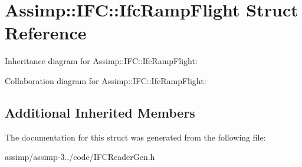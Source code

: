 \hypertarget{struct_assimp_1_1_i_f_c_1_1_ifc_ramp_flight}{\section{Assimp\+:\+:I\+F\+C\+:\+:Ifc\+Ramp\+Flight Struct Reference}
\label{struct_assimp_1_1_i_f_c_1_1_ifc_ramp_flight}
}


Inheritance diagram for Assimp\+:\+:I\+F\+C\+:\+:Ifc\+Ramp\+Flight\+:


Collaboration diagram for Assimp\+:\+:I\+F\+C\+:\+:Ifc\+Ramp\+Flight\+:
\subsection*{Additional Inherited Members}


The documentation for this struct was generated from the following file\+:\begin{DoxyCompactItemize}
\item 
assimp/assimp-\/3../code/I\+F\+C\+Reader\+Gen.\+h\end{DoxyCompactItemize}

